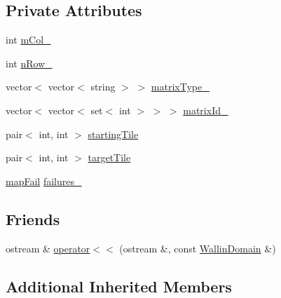 \subsection*{Private Attributes}
\begin{DoxyCompactItemize}
\item 
int \hyperlink{classghost_1_1WallinDomain_ad7989e0a59285a96bff061aa27d5bbd4}{m\-Col\-\_\-}
\item 
int \hyperlink{classghost_1_1WallinDomain_a2b4915025259fff122a44cfe5dca4b9e}{n\-Row\-\_\-}
\item 
vector$<$ vector$<$ string $>$ $>$ \hyperlink{classghost_1_1WallinDomain_a896291f065d8af3e1232eb8938ed0eb7}{matrix\-Type\-\_\-}
\item 
vector$<$ vector$<$ set$<$ int $>$ $>$ $>$ \hyperlink{classghost_1_1WallinDomain_ac119954ee820416a87abf75fcf46c095}{matrix\-Id\-\_\-}
\item 
pair$<$ int, int $>$ \hyperlink{classghost_1_1WallinDomain_aca537784fa6aa04effeb402d936530ce}{starting\-Tile}
\item 
pair$<$ int, int $>$ \hyperlink{classghost_1_1WallinDomain_a3a2cc8acb828fadffbe92fbe8f57cc9f}{target\-Tile}
\item 
\hyperlink{namespaceghost_af44c393431f46e255b1c303cd50854b8}{map\-Fail} \hyperlink{classghost_1_1WallinDomain_a8542900f71016a2d37b9ecb5466d0c2d}{failures\-\_\-}
\end{DoxyCompactItemize}
\subsection*{Friends}
\begin{DoxyCompactItemize}
\item 
ostream \& \hyperlink{classghost_1_1WallinDomain_a183a5a6c377b42188996fa08efa37a10}{operator$<$$<$} (ostream \&, const \hyperlink{classghost_1_1WallinDomain}{Wallin\-Domain} \&)
\end{DoxyCompactItemize}
\subsection*{Additional Inherited Members}


